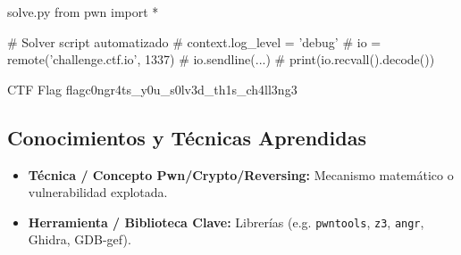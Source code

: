 \documentclass[../../../main_compilation.tex]{subfiles}
\begin{document}
\begin{codebox}[Python]{solve.py}
from pwn import *

# Solver script automatizado
# context.log_level = 'debug'
# io = remote('challenge.ctf.io', 1337)
# io.sendline(...)
# print(io.recvall().decode())
\end{codebox}

\begin{flagbox}{CTF Flag}
flag{c0ngr4ts_y0u_s0lv3d_th1s_ch4ll3ng3}
\end{flagbox}

\subsection{Conocimientos y Técnicas Aprendidas}

\begin{learningbox}
	\begin{itemize}[leftmargin=*]
		\item \textbf{Técnica / Concepto Pwn/Crypto/Reversing:} Mecanismo matemático o vulnerabilidad explotada.
		\item \textbf{Herramienta / Biblioteca Clave:} Librerías (e.g. \texttt{pwntools}, \texttt{z3}, \texttt{angr}, Ghidra, GDB-gef).
	\end{itemize}
\end{learningbox}

\begin{sourcebox}
	\begin{itemize}[leftmargin=*]
	\end{itemize}
\end{sourcebox}
\end{document}
